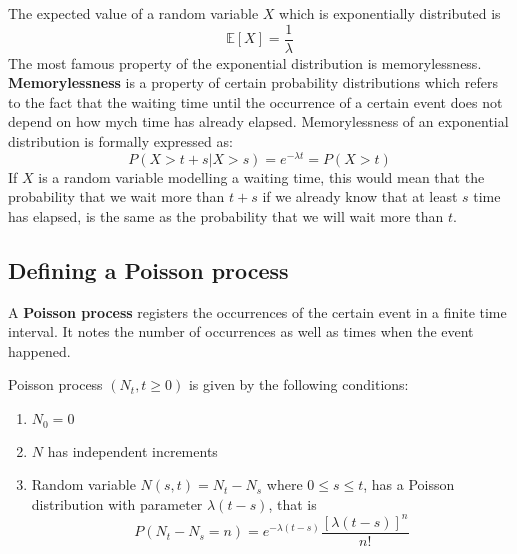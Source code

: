 \documentclass[times, utf8, diplomski]{fer}
\begin{document}
			\noindent The expected value of a random variable $X$ which is exponentially distributed is $$\mathbb{E}[X] = \frac{1}{\lambda}$$ The most famous property of the exponential distribution is memorylessness. \textbf{Memorylessness} is a property of certain probability distributions which refers to the fact that the waiting time until the occurrence of a certain event does not depend on how mych time has already elapsed. Memorylessness of an exponential distribution is formally expressed as: $$P(X > t + s | X>s) = e^{-\lambda t} = P(X > t)$$ If $X$ is a random variable modelling a waiting time, this would mean that the probability that we wait more than $t+s$ if we already know that at least $s$ time has elapsed, is the same as the probability that we will wait more than $t$. 
		\subsection{Defining a Poisson process}
		A \textbf{Poisson process} registers the occurrences of the certain event in a finite time interval. It notes the number of occurrences as well as times when the event happened. 
		\begin{definition}
			Poisson process $(N_t, t \geq 0)$ is given by the following conditions:
			\begin{enumerate}
				\item $N_0 = 0$
				\item $N$ has independent increments
				\item Random variable $N(s,t) = N_t - N_s$ where $0 \leq s \leq t$, has a Poisson distribution with parameter $\lambda (t-s)$, that is $$ P(N_t - N_s = n) = e^{-\lambda(t-s)}\frac{[\lambda(t-s)]^n}{n!} $$
			\end{enumerate}
		\end{definition}
\end{document}
